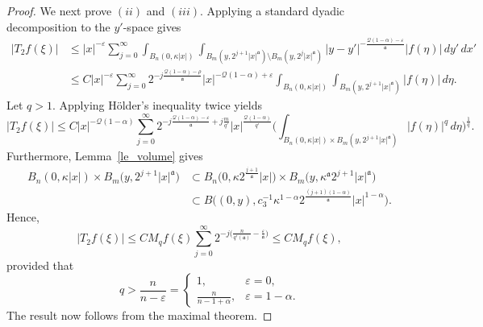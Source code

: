\documentclass[12pt]{amsart}
\begin{document}
\begin{proof}
We next prove $(ii)$ and $(iii)$. Applying a standard dyadic decomposition to the $y'$-space gives
\begin{align*}
    |T_2f(\xi)|
    &\le |x|^{-\varepsilon} \sum_{j=0}^\infty \int_{B_n(0,\kappa |x|)} \int_{B_m( y, 2^{j+1}|x|^{\mathfrak a} )\setminus B_m ( y, 2^{j}|x|^{\mathfrak a} )} |y-y'|^{-\frac{\mathcal{Q}(1-\alpha)-\varepsilon}{\mathfrak a}} |f(\eta)| \, dy' \, dx'\\
    &\le C |x|^{-\varepsilon} \sum_{j=0}^\infty 2^{-j\frac{\mathcal{Q}(1-\alpha)-\rho}{\mathfrak a}} |x|^{-\mathcal{Q}(1-\alpha)+\varepsilon} \int_{B_n(0,\kappa|x|)} \int_{B_m( y, 2^{j+1}|x|^{\mathfrak a} )} |f(\eta)| \, d\eta.
\end{align*}
Let $q>1$. Applying H\"older's inequality twice yields
\begin{equation}
    |T_2f(\xi)|\le C |x|^{-\mathcal{Q}(1-\alpha)} \sum_{j=0}^\infty 2^{-j\frac{\mathcal{Q}(1-\alpha)-\varepsilon}{\mathfrak a} + j\frac{m}{q'}} |x|^{\frac{\mathcal{Q}(1-\alpha)}{q'}} \biggl( \int_{B_n(0,\kappa|x|) \times B_m(y, 2^{j+1}|x|^{\mathfrak a})} |f(\eta)|^q \, d\eta \biggr)^{\!\frac{1}{q}}.
\end{equation}
Furthermore, Lemma~\ref{le_volume} gives
\begin{align*}
    B_n(0,\kappa|x|) \times B_m\bigl(y, 2^{j+1}|x|^{\mathfrak a}\bigr)
    &\subset B_n\bigl(0,\kappa 2^{\frac{j+1}{\mathfrak a}}|x|\bigr) \times B_m\bigl(y, \kappa^{\mathfrak a} 2^{j+1}|x|^{\mathfrak a}\bigr)\\
    &\subset B\bigl((0,y), c_3^{-1} \kappa^{1-\alpha} 2^{\frac{(j+1)(1-\alpha)}{\mathfrak a}} |x|^{1-\alpha}\bigr).
\end{align*}
Hence,
\begin{equation*}
    |T_2f(\xi)|\le C M_q f(\xi) \sum_{j=0}^\infty 2^{-j\bigl( \frac{n}{q'(\mathfrak a)} - \frac{\varepsilon}{\mathfrak a} \bigr)} \le C M_q f(\xi),
\end{equation*}
provided that
\begin{equation*}
    q > \frac{n}{n-\varepsilon} = \begin{cases}
        1, &\varepsilon=0,\\[4pt]
        \frac{n}{n-1+\alpha}, &\varepsilon=1-\alpha.
    \end{cases}
\end{equation*}
The result now follows from the maximal theorem.
\end{proof}
\end{document}
